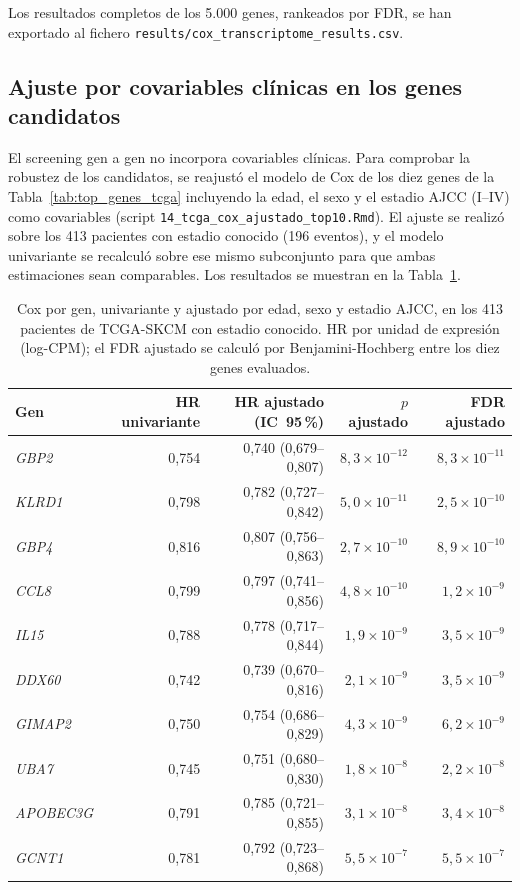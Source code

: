 Los resultados completos de los 5.000 genes, rankeados por FDR, se han exportado al fichero \texttt{results/cox\_transcriptome\_results.csv}.

\subsection{Ajuste por covariables clínicas en los genes candidatos}

El screening gen a gen no incorpora covariables clínicas. Para comprobar la robustez de los candidatos, se reajustó el modelo de Cox de los diez genes de la Tabla~\ref{tab:top_genes_tcga} incluyendo la edad, el sexo y el estadio AJCC (I--IV) como covariables (script \texttt{14\_tcga\_cox\_ajustado\_top10.Rmd}). El ajuste se realizó sobre los 413 pacientes con estadio conocido (196 eventos), y el modelo univariante se recalculó sobre ese mismo subconjunto para que ambas estimaciones sean comparables. Los resultados se muestran en la Tabla~\ref{tab:cox_ajustado_top10}.

\begin{table}[H]
\centering
\caption{Cox por gen, univariante y ajustado por edad, sexo y estadio AJCC, en los 413 pacientes de TCGA-SKCM con estadio conocido. HR por unidad de expresión (log-CPM); el FDR ajustado se calculó por Benjamini-Hochberg entre los diez genes evaluados.}
\label{tab:cox_ajustado_top10}
\begin{tabularx}{\textwidth}{l r r r r}
\toprule
Gen & HR univariante & HR ajustado (IC~95\,\%) & $p$ ajustado & FDR ajustado \\
\midrule
\textit{GBP2} & 0,754 & 0,740 (0,679--0,807) & $8{,}3\times10^{-12}$ & $8{,}3\times10^{-11}$ \\
\textit{KLRD1} & 0,798 & 0,782 (0,727--0,842) & $5{,}0\times10^{-11}$ & $2{,}5\times10^{-10}$ \\
\textit{GBP4} & 0,816 & 0,807 (0,756--0,863) & $2{,}7\times10^{-10}$ & $8{,}9\times10^{-10}$ \\
\textit{CCL8} & 0,799 & 0,797 (0,741--0,856) & $4{,}8\times10^{-10}$ & $1{,}2\times10^{-9}$ \\
\textit{IL15} & 0,788 & 0,778 (0,717--0,844) & $1{,}9\times10^{-9}$ & $3{,}5\times10^{-9}$ \\
\textit{DDX60} & 0,742 & 0,739 (0,670--0,816) & $2{,}1\times10^{-9}$ & $3{,}5\times10^{-9}$ \\
\textit{GIMAP2} & 0,750 & 0,754 (0,686--0,829) & $4{,}3\times10^{-9}$ & $6{,}2\times10^{-9}$ \\
\textit{UBA7} & 0,745 & 0,751 (0,680--0,830) & $1{,}8\times10^{-8}$ & $2{,}2\times10^{-8}$ \\
\textit{APOBEC3G} & 0,791 & 0,785 (0,721--0,855) & $3{,}1\times10^{-8}$ & $3{,}4\times10^{-8}$ \\
\textit{GCNT1} & 0,781 & 0,792 (0,723--0,868) & $5{,}5\times10^{-7}$ & $5{,}5\times10^{-7}$ \\
\bottomrule
\end{tabularx}
\end{table}


